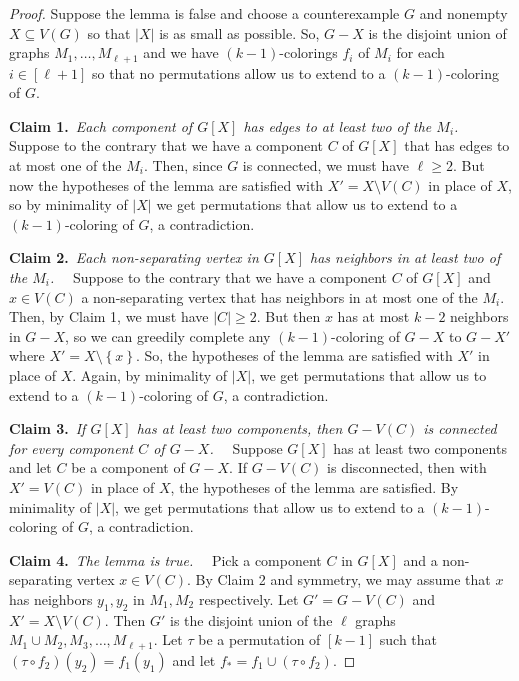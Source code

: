 \documentclass[12pt]{article}
\theoremstyle{plain}
\theoremstyle{definition}
\theoremstyle{remark}
\newcommand{\set}[1]{\left\{ #1 \right\}}
\newcommand{\irange}[1]{\left[#1\right]}
\newcommand{\claim}[2]{{\bf Claim #1.}~{\it #2}~~}
\begin{document}
\begin{proof}
Suppose the lemma is false and choose a counterexample $G$ and nonempty $X \subseteq V(G)$ so that $|X|$ is as small as possible.  So, $G-X$ is the disjoint union of graphs $M_1, \ldots, M_{\ell + 1}$ and we have $(k-1)$-colorings $f_i$ of $M_i$ for each $i \in \irange{\ell + 1}$ so that no permutations allow us to extend to a $(k - 1)$-coloring of $G$.

\claim{1}{Each component of $G[X]$ has edges to at least two of the $M_i$.}
Suppose to the contrary that we have a component $C$ of $G[X]$ that has edges to at most one of the $M_i$.  Then, since $G$ is connected, we must have $\ell \ge 2$. But now the hypotheses of the lemma are satisfied with $X' = X \setminus V(C)$ in place of $X$, so by minimality of $|X|$ we get permutations that allow us to extend to a $(k - 1)$-coloring of $G$, a contradiction.

\claim{2}{Each non-separating vertex in $G[X]$ has neighbors in at least two of the $M_i$.}
Suppose to the contrary that we have a component $C$ of $G[X]$ and $x \in V(C)$ a non-separating vertex that has neighbors in at most one of the $M_i$.  Then, by Claim 1, we must have $|C| \ge 2$.  But then $x$ has at most $k-2$ neighbors in $G-X$, so we can greedily complete any $(k-1)$-coloring of $G-X$ to $G-X'$ where $X' = X \setminus \set{x}$.  So, the hypotheses of the lemma are satisfied with $X'$ in place of $X$.  Again, by minimality of $|X|$, we get permutations that allow us to extend to a $(k - 1)$-coloring of $G$, a contradiction.

\claim{3}{If $G[X]$ has at least two components, then $G - V(C)$ is connected for every component $C$ of $G-X$.}
Suppose $G[X]$ has at least two components and let $C$ be a component of $G-X$.  If $G-V(C)$ is disconnected, then with $X'=V(C)$ in place of $X$, the hypotheses of the lemma are satisfied. By minimality of $|X|$, we get permutations that allow us to extend to a $(k - 1)$-coloring of $G$, a contradiction.

\claim{4}{The lemma is true.}
Pick a component $C$ in $G[X]$ and a non-separating vertex $x \in V(C)$.  By Claim 2 and symmetry, we may assume that $x$ has neighbors $y_1, y_2$ in $M_1, M_2$ respectively.  Let $G' = G - V(C)$ and $X' = X \setminus V(C)$.  Then $G'$ is the disjoint union of the $\ell$ graphs $M_1 \cup M_2, M_3, \ldots, M_{\ell + 1}$.  Let $\tau$ be a permutation of $\irange{k-1}$ such that $(\tau \circ f_2)(y_2) = f_1(y_1)$ and let $f_* = f_1 \cup (\tau \circ f_2)$. 


\end{proof}
\end{document}
